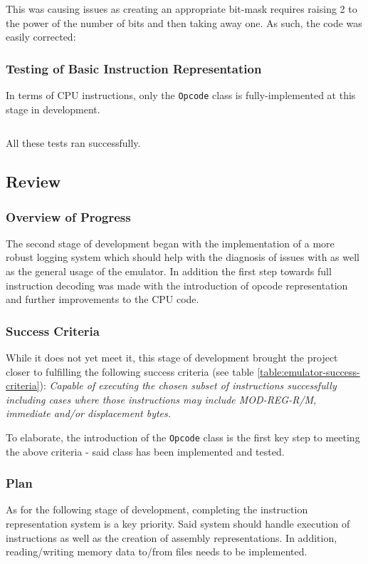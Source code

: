         This was causing issues as creating an appropriate bit-mask requires raising 2 to the power of the number of bits and then taking away one. As such, the code was easily corrected: 


    \subsubsection{Testing of Basic Instruction Representation}
        In terms of CPU instructions, only the \texttt{Opcode} class is fully-implemented at this stage in development.

        \inputminted{c++}{code/second/testinstructions.cpp}

        All these tests ran successfully.

\subsection{Review}
    \subsubsection{Overview of Progress}
        The second stage of development began with the implementation of a more robust logging system which should help with the diagnosis of issues with as well as the general usage of the emulator. In addition the first step towards full instruction decoding was made with the introduction of opcode representation and further improvements to the CPU code.

    \subsubsection{Success Criteria}
        While it does not yet meet it, this stage of development brought the project closer to fulfilling the following success criteria (see table \ref{table:emulator-success-criteria}): \textit{Capable of executing the chosen subset of instructions successfully including cases where those instructions may include MOD-REG-R/M, immediate and/or displacement bytes.}

        To elaborate, the introduction of the \texttt{Opcode} class is the first key step to meeting the above criteria - said class has been implemented and tested.

    \subsubsection{Plan}
        As for the following stage of development, completing the instruction representation system is a key priority. Said system should handle execution of instructions as well as the creation of assembly representations. In addition, reading/writing memory data to/from files needs to be implemented.




